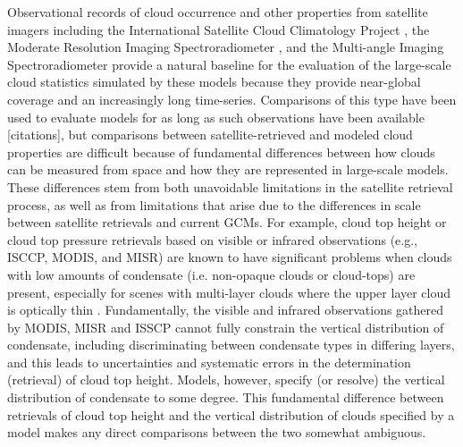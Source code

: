 Observational records of cloud occurrence and other properties from satellite imagers including the International Satellite Cloud Climatology Project \citep[ISCCP][]{rossow_and_schiffer_1999}, the Moderate Resolution Imaging Spectroradiometer \citep[MODIS][]{king_et_al_2003}, and the Multi-angle Imaging Spectroradiometer \citep[MISR][]{diner_et_al_2002, diner_et_al_2005} provide a natural baseline for the evaluation of the large-scale cloud statistics simulated by these models because they provide near-global coverage and an increasingly long time-series. Comparisons of this type have been used to evaluate models for as long as such observations have been available [citations], but comparisons between satellite-retrieved and modeled cloud properties are difficult because of fundamental differences between how clouds can be measured from space and how they are represented in large-scale models. These differences stem from both unavoidable limitations in the satellite retrieval process, as well as from limitations that arise due to the differences in scale between satellite retrievals and current GCMs. For example, cloud top height or cloud top pressure retrievals based on visible or infrared observations (e.g., ISCCP, MODIS, and MISR) are known to have significant problems when clouds with low amounts of condensate (i.e. non-opaque clouds or cloud-tops) are present, especially for scenes with multi-layer clouds where the upper layer cloud is optically thin \citep{marchand_et_al_2010, pincus_et_al_2012}. Fundamentally, the visible and infrared observations gathered by MODIS, MISR and ISSCP cannot fully constrain the vertical distribution of condensate, including discriminating between condensate types in differing layers, and this leads to uncertainties and systematic errors in the determination (retrieval) of cloud top height. Models, however, specify (or resolve) the vertical distribution of condensate to some degree. This fundamental difference between retrievals of cloud top height and the vertical distribution of clouds specified by a model makes any direct comparisons between the two somewhat ambiguous.

